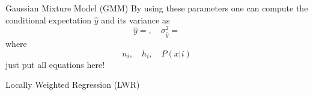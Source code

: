 \documentclass{beamer}
\begin{document}
\begin{frame}{Gaussian Mixture Model (GMM)}
By using these parameters one can compute the conditional expectation $\hat{y}$
and its variance as
\begin{equation}
  \hat{y} = ,\quad \sigma_{\hat{y}}^2 =
\end{equation}
where
\begin{equation}
n_i, \quad h_i, \quad P(x|i)
\end{equation}
just put all equations here!
\end{frame}



\begin{frame}{Locally Weighted Regression (LWR)}

\end{frame}
\end{document}
